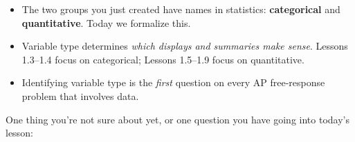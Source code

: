 \documentclass[10pt]{article}
\begin{document}
\vspace{0.18in}

\begin{tcolorbox}[colback=greenbg, colframe=greenacc, boxrule=0.8pt, arc=2mm,
    left=4mm, right=4mm, top=3mm, bottom=3mm]
\small
\begin{itemize}[leftmargin=1.3em, itemsep=6pt]
  \item The two groups you just created have names in statistics:
        \textbf{categorical} and \textbf{quantitative}. Today we formalize this.
  \item Variable type determines \emph{which displays and summaries make sense}.
        Lessons 1.3--1.4 focus on categorical; Lessons 1.5--1.9 focus on quantitative.
  \item Identifying variable type is the \emph{first} question on every AP free-response
        problem that involves data.
\end{itemize}
\end{tcolorbox}

\vspace{0.14in}

\noindent\textcolor{slate}{\small One thing you're not sure about yet, or one question you have going
into today's lesson:}\\[8pt]
\writeline
\end{document}

